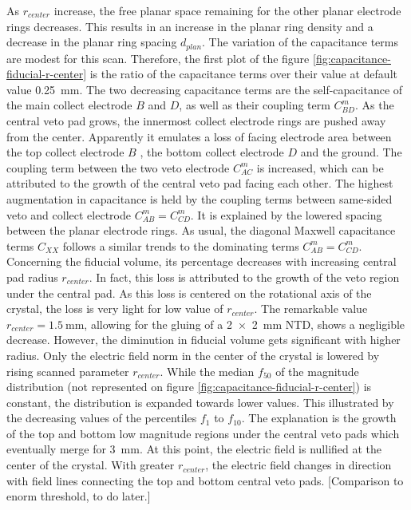 As $r_{center}$ increase, the free planar space remaining for the other planar electrode rings decreases. This results in an increase in the planar ring density and a decrease in the planar ring spacing $d_{plan}$.
The variation of the capacitance terms are modest for this scan. Therefore, the first plot of the figure \ref{fig:capacitance-fiducial-r-center} is the ratio of the capacitance terms over their value at default value \SI{0.25}{\mm}. The two decreasing capacitance terms are the self-capacitance of the main collect electrode $B$ and $D$, as well as their coupling term $C_{BD}^m$. As the central veto pad grows, the innermost collect electrode rings are pushed away from the center. Apparently it emulates a loss of facing electrode area between the top collect electrode $B$ , the bottom collect electrode $D$ and the ground. The coupling term between the two veto electrode $C_{AC}^m$ is increased, which can be attributed to the growth of the central veto pad facing each other. The highest augmentation in capacitance is held by the coupling terms between same-sided veto and collect electrode $C_{AB}^m=C_{CD}^m$. It is explained by the lowered spacing between the planar electrode rings. As usual, the diagonal Maxwell capacitance terms $C_{XX}$ follows a similar trends to the dominating terms $C_{AB}^m=C_{CD}^m$.
Concerning the fiducial volume, its percentage decreases with increasing central pad radius $r_{center}$. In fact, this loss is attributed to the growth of the veto region under the central pad. As this loss is centered on the rotational axis of the crystal, the loss is very light for low value of $r_{center}$. The remarkable value $r_{center} = \SI{1.5}{\mm}$, allowing for the gluing of a \SI{2 x 2}{\mm} NTD, shows a negligible decrease. However, the diminution in fiducial volume gets significant with higher radius.
Only the electric field norm in the center of the crystal is lowered by rising scanned parameter $r_{center}$. While the median $f_{50}$ of the magnitude distribution (not represented on figure \ref{fig:capacitance-fiducial-r-center}) is constant, the distribution is expanded towards lower values. This illustrated by the decreasing values of the percentiles $f_{1}$ to $f_{10}$. The explanation is the growth of the top and bottom low magnitude regions under the central veto pads which eventually merge for \SI{3}{\mm}. At this point, the electric field is nullified at the center of the crystal. With greater $r_{center}$, the electric field changes in direction with field lines connecting the top and bottom central veto pads.
{\color{red} [Comparison to enorm threshold, to do later.]}


